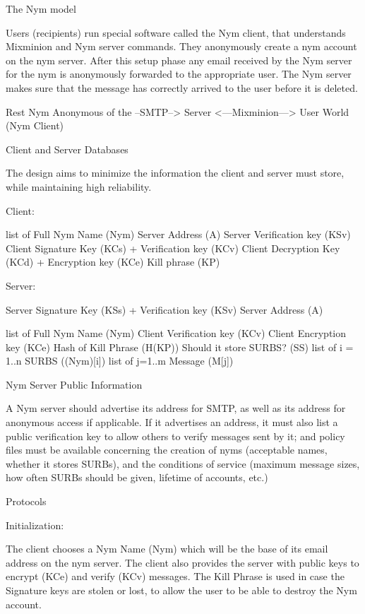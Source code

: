 The Nym model

Users (recipients) run special software called the Nym client, that
understands Mixminion and Nym server commands. They anonymously create
a nym account on the nym server. After this setup phase any email
received by the Nym server for the nym is anonymously forwarded to
the appropriate user. The Nym server makes sure that the message has
correctly arrived to the user before it is deleted.

   Rest           Nym                      Anonymous
 of the --SMTP--> Server <---Mixminion---> User
  World                                    (Nym Client)

Client and Server Databases

The design aims to minimize the information the client and server must
store, while maintaining high reliability.

Client:

list of {
  Full Nym Name (Nym)
  Server Address (A)
  Server Verification key (KSv)
  Client Signature Key (KCs) + Verification key (KCv)
  Client Decryption Key (KCd) + Encryption key (KCe)
  Kill phrase (KP)
}

Server:

Server Signature Key (KSs) + Verification key (KSv)
Server Address (A)

list of {
  Full Nym Name (Nym)
  Client Verification key (KCv)
  Client Encryption key (KCe)
  Hash of Kill Phrase (H(KP))
  Should it store SURBS? (SS)
  list of i = 1..n {
    SURBS ((Nym)[i])
  }
  list of j=1..m {
    Message (M[j])
  }
}

Nym Server Public Information

A Nym server should advertise its address for SMTP, as well as its address
for anonymous access if applicable. If it advertises an address, it must
also list a public verification key to allow others to verify messages
sent by it; and policy files must be available concerning the creation
of nyms (acceptable names, whether it stores SURBs), and the conditions
of service (maximum message sizes, how often SURBs should be given,
lifetime of accounts, etc.)

Protocols

Initialization:

The client chooses a Nym Name (Nym) which will be the base of its
email address on the nym server. The client also provides the server
with public keys to encrypt (KCe) and verify (KCv) messages. The Kill
Phrase is used in case the Signature keys are stolen or lost, to allow
the user to be able to destroy the Nym account.

